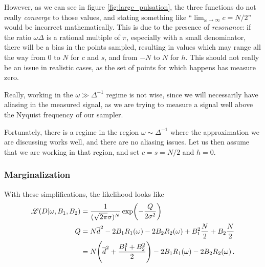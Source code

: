 \documentclass[main.tex]{subfiles}
\begin{document}
However, as we can see in figure \ref{fig:large_pulsation}, the three functions do not really \emph{converge} to those values, and stating something like ``\(\lim_{\omega \to \infty } c = N /2\)'' would be incorrect mathematically.
This is due to the presence of \emph{resonance}: if the ratio \(\omega \Delta \) is a rational multiple of \(\pi \), especially with a small denominator, there will be a bias in the points sampled, resulting in values which may range all the way from 0 to \(N\) for \(c\) and \(s\), and from \(-N\) to \(N\) for \(h\). 
This should not really be an issue in realistic cases, as the set of points for which happens has measure zero. 

Really, working in the \(\omega \gg \Delta^{-1}\) regime is not wise, since we will necessarily have aliasing in the measured signal, as we are trying to measure a signal well above the Nyquist frequency of our sampler.

Fortunately, there is a regime in the region \(\omega \sim \Delta^{-1}\) where the approximation we are discussing works well, and there are no aliasing issues. 
Let us then assume that we are working in that region, and set \(c = s = N/2\) and \(h = 0\).

\subsubsection{Marginalization}

With these simplifications, the likelihood looks like 
%
\begin{align}
\mathscr{L}(D | \omega , B_1 , B_2 ) &= \frac{1}{(\sqrt{2 \pi } \sigma )^{N}}
\exp(- \frac{Q}{2 \sigma^2})  \\
Q &= 
N \overline{d}^2 - 2 B_1 R_1(\omega ) -2 B_2 R_2(\omega ) + B_1^2 \frac{N}{2} + B_2 \frac{N}{2}  \\
&= N \qty(\overline{d}^2 + \frac{B_1^2 + B_2^2}{2}) - 2 B_1 R_1(\omega ) - 2 B_2 R_2(\omega )
\,.
\end{align}
\end{document}
